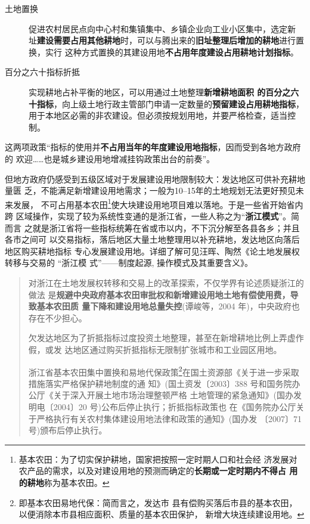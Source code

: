 \begin{description}
\item[土地置换] 促进农村居民点向中心村和集镇集中、乡镇企业向工业小区集中，选定新
  址\textbf{建设需要占用其他耕地}时，可以与腾出来的\textbf{旧址整理后增加的耕地}进行置换，实行
  这种方式置换的其建设用地\textbf{不占用年度建设占用耕地计划指标}。


\item[百分之六十指标折抵] 实现耕地占补平衡的地区，可以用通过土地整理\textbf{新增耕地面积
  的百分之六十指标}，向上级土地行政主管部门申请一定数量的\textbf{预留建设占用耕地指标}，
  用于本地区必需的非农建设。但必须按规划用地，并要严格检查，适当控制。
\end{description}

这两项政策“指标的使用并\textbf{不占用当年的年度建设用地指标}，因而受到各地方政府的
欢迎……也是城乡建设用地增减挂钩政策出台的前奏”。

但地方政府仍感受到五级区域对于发展建设用地限制较大：发达地区可供补充耕地量匮
乏，不能满足新增建设用地需求；一般为10--15年的土地规划无法更好预见未来发展，
不可占用基本农田\footnote{基本农田：为了切实保护耕地，国家把按照一定时期人口和社会经
  济发展对农产品的需求，以及对建设用地的预测而确定的\textbf{长期或一定时期内不得占
    用的耕地}称为基本农田。}使大块建设用地项目难以落地。于是一些省开始省内跨
区域操作，实现了较为系统性变通的是浙江省，一些人称之为“\textbf{浙江模式}”。简而言
之就是浙江省将一些指标统筹在省或市以内，不下沉分解至各县各乡；并且各市之间可
以交易指标，落后地区大量土地整理用以补充耕地，发达地区向落后地区购买耕地指标
专心发展建设用地。详细了解可见汪晖、陶然《论土地发展权转移与交易的 “浙江模
式”——制度起源, 操作模式及其重要含义》。


\begin{quotation}
  对浙江在土地发展权转移和交易上的改革探索，不仅学界有论述质疑浙江的做法
  是\textbf{规避中央政府基本农田审批权和新增建设用地土地有偿使用费，导致基本农田质
    量下降和建设用地总量失控}(谭峻等，2004 年)，中央政府也存在不少担心。

  欠发达地区为了折抵指标过度投资土地整理，甚至在新增耕地比例上弄虚作假，或发
  达地区通过购买折抵指标无限制扩张城市和工业园区用地。

  浙江省基本农田集中置换和易地代保政策\footnote{即基本农田易地代保：简而言之，发达市
    县有偿购买落后市县的基本农田，以便消除本市县相应面积、质量的基本农田保护，
    新增大块连续建设用地。}在国土资源部《关于进一步采取措施落实严格保护耕地制度的通
  知》(国土资发〔2003〕388 号和国务院办公厅《关于深入开展土地市场治理整顿严格
  土地管理的紧急通知》(国办发明电〔2004〕20 号)公布后停止执行；折抵指标政策也
  在《国务院办公厅关于严格执行有关农村集体建设用地法律和政策的通知》(国办发
  〔2007〕71 号)颁布后停止执行。\cite{wangzhejiang}
\end{quotation}




